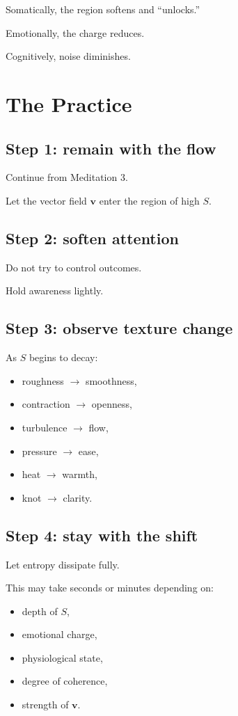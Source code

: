 \documentclass[12pt]{article}
\begin{document}
Somatically, the region softens and ``unlocks.''

Emotionally, the charge reduces.

Cognitively, noise diminishes.

\section{The Practice}

\subsection*{Step 1: remain with the flow}

Continue from Meditation 3.

Let the vector field $\mathbf{v}$ enter the region of high $S$.

\subsection*{Step 2: soften attention}

Do not try to control outcomes.

Hold awareness lightly.

\subsection*{Step 3: observe texture change}

As $S$ begins to decay:

\begin{itemize}
    \item roughness $\to$ smoothness,
    \item contraction $\to$ openness,
    \item turbulence $\to$ flow,
    \item pressure $\to$ ease,
    \item heat $\to$ warmth,
    \item knot $\to$ clarity.
\end{itemize}

\subsection*{Step 4: stay with the shift}

Let entropy dissipate fully.

This may take seconds or minutes depending on:

\begin{itemize}
    \item depth of $S$,
    \item emotional charge,
    \item physiological state,
    \item degree of coherence,
    \item strength of $\mathbf{v}$.
\end{itemize}
\end{document}

